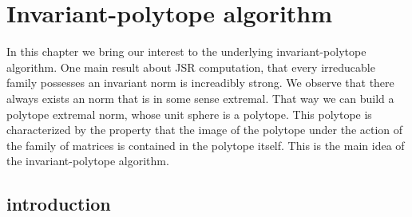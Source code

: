 
\chapter{Invariant-polytope algorithm}
\label{ch:inv.poly}	

In this chapter we bring our interest to the underlying invariant-polytope algorithm. 
One main result about JSR computation, that every irreducable family possesses an invariant norm is increadibly strong. We observe that there always exists an norm that is in some sense extremal. That way we can build a polytope extremal norm, whose unit sphere is a polytope. This polytope is characterized by the property that the image of the polytope under the action of the family of matrices is contained in the polytope itself. This is the main idea of the invariant-polytope algorithm.

\section{introduction}
\label{sec:poly-intro}






